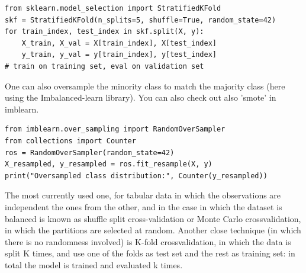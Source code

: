 \documentclass[24pt]{article}
\begin{document}


\begin{lstlisting}  
from sklearn.model_selection import StratifiedKFold
skf = StratifiedKFold(n_splits=5, shuffle=True, random_state=42)
for train_index, test_index in skf.split(X, y):
    X_train, X_val = X[train_index], X[test_index]
    y_train, y_val = y[train_index], y[test_index]
# train on training set, eval on validation set 
\end{lstlisting}  

One can also oversample the minority class to match the majority class (here using the Imbalanced-learn library). You can also check out also 'smote' in imblearn.

\begin{lstlisting}  
from imblearn.over_sampling import RandomOverSampler
from collections import Counter
ros = RandomOverSampler(random_state=42)
X_resampled, y_resampled = ros.fit_resample(X, y)
print("Oversampled class distribution:", Counter(y_resampled))
\end{lstlisting}  


The most currently used one, for tabular data in which the observations are independent the ones from the other, and in the case in which the dataset is balanced is known as shuffle split cross-validation or Monte Carlo crossvalidation, in which the partitions are selected at random. Another close technique (in which there is no randomness involved) is K-fold crossvalidation, in which the data is split K times, and use one of the folds as test set and the rest as training set: in total the model is trained and evaluated k times.
\end{document}
